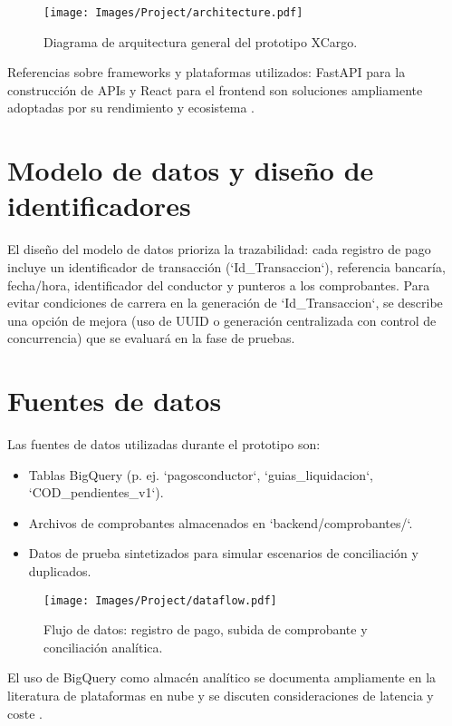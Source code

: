 \begin{figure}[htbp]
	\centering
	\texttt{[image: Images/Project/architecture.pdf]}
	\caption{Diagrama de arquitectura general del prototipo XCargo.}
	\label{fig:arquitectura}
\end{figure}

\noindent Referencias sobre frameworks y plataformas utilizados: FastAPI para la construcción de APIs y React para el frontend son soluciones ampliamente adoptadas por su rendimiento y ecosistema \cite{fastapi2020, react2013}.

\section{Modelo de datos y diseño de identificadores}
El diseño del modelo de datos prioriza la trazabilidad: cada registro de pago incluye un identificador de transacción (`Id_Transaccion`), referencia bancaría, fecha/hora, identificador del conductor y punteros a los comprobantes. Para evitar condiciones de carrera en la generación de `Id_Transaccion`, se describe una opción de mejora (uso de UUID o generación centralizada con control de concurrencia) que se evaluará en la fase de pruebas.

\section{Fuentes de datos}
Las fuentes de datos utilizadas durante el prototipo son:
\begin{itemize}
	\item Tablas BigQuery (p. ej. `pagosconductor`, `guias_liquidacion`, `COD_pendientes_v1`).
	\item Archivos de comprobantes almacenados en `backend/comprobantes/`.
	\item Datos de prueba sintetizados para simular escenarios de conciliación y duplicados.
\end{itemize}

\begin{figure}[htbp]
	\centering
	\texttt{[image: Images/Project/dataflow.pdf]}
	\caption{Flujo de datos: registro de pago, subida de comprobante y conciliación analítica.}
	\label{fig:dataflow}
\end{figure}

\noindent El uso de BigQuery como almacén analítico se documenta ampliamente en la literatura de plataformas en nube y se discuten consideraciones de latencia y coste \cite{bigquery2011}.


